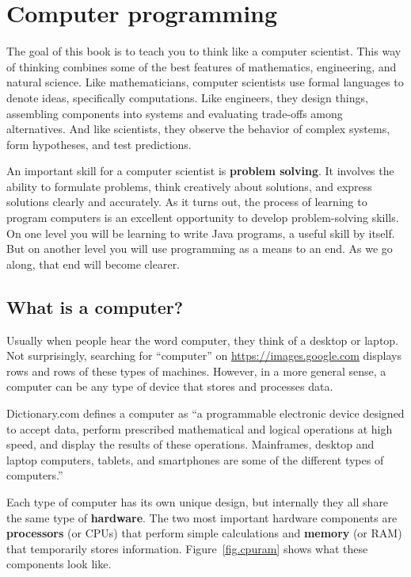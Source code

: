 \chapter{Computer programming}
\label{theway}

The goal of this book is to teach you to think like a computer scientist.
This way of thinking combines some of the best features of mathematics, engineering, and natural science.
Like mathematicians, computer scientists use formal languages to denote ideas, specifically computations.
Like engineers, they design things, assembling components into systems and evaluating trade-offs among alternatives.
And like scientists, they observe the behavior of complex systems, form hypotheses, and test predictions.


An important skill for a computer scientist is {\bf problem solving}.
It involves the ability to formulate problems, think creatively about solutions, and express solutions clearly and accurately.
As it turns out, the process of learning to program computers is an excellent opportunity to develop problem-solving skills.
On one level you will be learning to write Java programs, a useful skill by itself.
But on another level you will use programming as a means to an end.
As we go along, that end will become clearer.


\section{What is a computer?}

Usually when people hear the word computer, they think of a desktop or laptop.
Not surprisingly, searching for ``computer'' on \url{https://images.google.com} displays rows and rows of these types of machines.
However, in a more general sense, a computer can be any type of device that stores and processes data.

Dictionary.com defines a computer as ``a programmable electronic device designed to accept data, perform prescribed mathematical and logical operations at high speed, and display the results of these operations.
Mainframes, desktop and laptop computers, tablets, and smartphones are some of the different types of computers.''


Each type of computer has its own unique design, but internally they all share the same type of {\bf hardware}.
The two most important hardware components are {\bf processors} (or CPUs) that perform simple calculations and {\bf memory} (or RAM) that temporarily stores information.
Figure~\ref{fig.cpuram} shows what these components look like.


